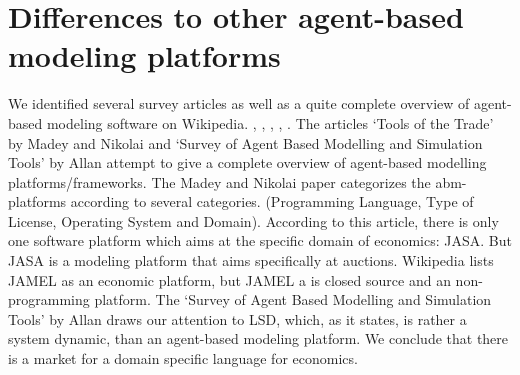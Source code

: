 \documentclass[letterpaper,10pt,english]{sphinxmanual}
\begin{document}
\chapter{Differences to other agent-based modeling platforms}
\label{introduction:differences-to-other-agent-based-modeling-platforms}
We identified several survey articles as well as
a quite complete overview of agent-based modeling software
on Wikipedia. \cite{Serenko2002}, \cite{Allan2010}
\cite{Societies2009}, \cite{Tobias2004}, \cite{Railsback2006},
\cite{abmcomparisonWikipedia2013}. The articles
`Tools of the Trade' by Madey and Nikolai \cite{Societies2009}
and `Survey of Agent Based Modelling and Simulation Tools' by Allan  \cite{Allan2010}
attempt to give a complete overview
of agent-based modelling platforms/frameworks. The Madey and Nikolai paper
categorizes the abm-platforms according
to several categories. (Programming Language, Type of License,
Operating System and Domain). According to this article, there
is only one software platform which aims at the specific
domain of economics: JASA. But JASA is a modeling platform
that aims specifically at auctions.
Wikipedia \cite{abmcomparisonWikipedia2013} lists JAMEL
as an economic platform, but JAMEL a is closed source and
an non-programming platform. The `Survey of Agent Based Modelling and Simulation Tools'
by Allan \cite{Allan2010} draws
our attention to LSD, which, as it states, is rather a system dynamic,
than an agent-based modeling platform. We conclude that
there is a market for a domain specific language for economics.
\end{document}
